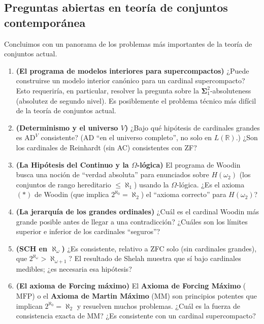 \subsection{Preguntas abiertas en teoría de conjuntos contemporánea}

Concluimos con un panorama de los problemas más importantes de la teoría de conjuntos actual.

\begin{enumerate}[leftmargin=2em, label=\textbf{PA\arabic*.}]

  \item \textbf{(El programa de modelos interiores para supercompactos)} ¿Puede construirse un modelo interior canónico para un cardinal supercompacto? Esto requeriría, en particular, resolver la pregunta sobre la $\mathbf{\Sigma}^2_1$-absoluteness (absolutez de segundo nivel). Es posiblemente el problema técnico más difícil de la teoría de conjuntos actual.

  \item \textbf{(Determinismo y el universo $V$)} ¿Bajo qué hipótesis de cardinales grandes es $\mathrm{AD}^{V}$ consistente? (AD ``en el universo completo'', no solo en $L(\mathbb{R})$.) ¿Son los cardinales de Reinhardt (sin AC) consistentes con ZF?

  \item \textbf{(La Hipótesis del Continuo y la $\Omega$-lógica)} El programa de Woodin busca una noción de ``verdad absoluta'' para enunciados sobre $H(\omega_2)$ (los conjuntos de rango hereditario $\leq \aleph_1$) usando la $\Omega$-lógica. ¿Es el axioma $(\ast)$ de Woodin (que implica $2^{\aleph_0} = \aleph_2$) el ``axioma correcto'' para $H(\omega_2)$?

  \item \textbf{(La jerarquía de los grandes ordinales)} ¿Cuál es el cardinal Woodin más grande posible antes de llegar a una contradicción? ¿Cuáles son los límites superior e inferior de los cardinales ``seguros''?

  \item \textbf{(SCH en $\aleph_\omega$)} ¿Es consistente, relativo a ZFC solo (sin cardinales grandes), que $2^{\aleph_\omega} > \aleph_{\omega+1}$? El resultado de Shelah muestra que sí bajo cardinales medibles; ¿es necesaria esa hipótesis?

  \item \textbf{(El axioma de Forcing máximo)} El \textbf{Axioma de Forcing Máximo} ($\mathrm{MFP}$) o el \textbf{Axioma de Martin Máximo} ($\mathrm{MM}$) son principios potentes que implican $2^{\aleph_0} = \aleph_2$ y resuelven muchos problemas. ¿Cuál es la fuerza de consistencia exacta de MM? ¿Es consistente con un cardinal supercompacto?


\end{enumerate}
